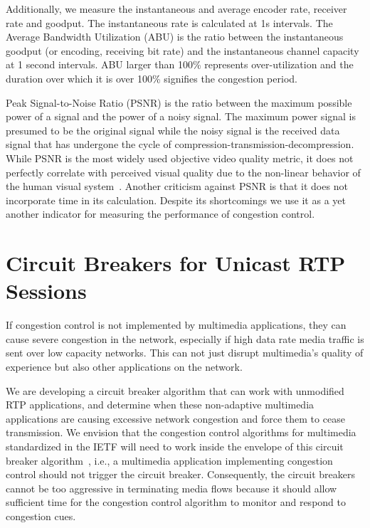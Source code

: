 Additionally, we measure the instantaneous and average encoder rate, receiver
rate and goodput. The instantaneous rate is calculated at 1s intervals. The
Average Bandwidth Utilization (ABU) is the ratio between the instantaneous
goodput (or encoding, receiving bit rate) and the instantaneous channel
capacity at 1 second intervals. ABU larger than 100\% represents over-utilization 
and the duration over which it is over 100\% signifies the congestion period.


Peak Signal-to-Noise Ratio (PSNR) is the ratio between the maximum possible
power of a signal and the power of a noisy signal. The maximum power signal is
presumed to be the original signal while the noisy signal is the received data
signal that has undergone the cycle of compression-transmission-decompression.
While PSNR is the most widely used objective video quality metric, it does not
perfectly correlate with perceived visual quality due to the non-linear
behavior of the human visual system~\cite{itu-t-j247}. Another criticism
against PSNR is that it does not incorporate time in its calculation. Despite
its shortcomings we use it as a yet another indicator for measuring the
performance of congestion control.



\section{Circuit Breakers for Unicast RTP Sessions}

If congestion control is not implemented by multimedia applications, they can
cause severe congestion in the network, especially if high data rate media
traffic is sent over low capacity networks. This can not just disrupt
multimedia's quality of experience but also other applications on the network.

We are developing a circuit breaker algorithm that can work with unmodified
RTP applications, and determine when these non-adaptive multimedia
applications are causing excessive network congestion and force them to cease
transmission.  We envision that the congestion control algorithms for
multimedia standardized in the IETF will need to work inside the envelope of
this circuit breaker algorithm~\cite{draft.rmcat.evaluate}, i.e., a multimedia
application implementing congestion control should not trigger the circuit
breaker. Consequently, the circuit breakers cannot be too aggressive in
terminating media flows because it should allow sufficient time for the
congestion control algorithm to monitor and respond to congestion cues.

